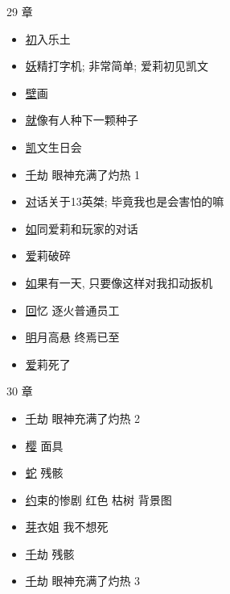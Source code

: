 \documentclass[a4paper]{article}
\begin{document}
29 章

\begin{itemize}
    \item \href{https://www.bilibili.com/video/BV15Y4y1872S/} 初入乐土
    \item \href{https://www.bilibili.com/video/BV15Y4y1872S/?t=4118} 妖精打字机; 非常简单; 爱莉初见凯文
    \item \href{https://www.bilibili.com/video/BV15Y4y1872S/?t=5141} 壁画
    \item \href{https://www.bilibili.com/video/BV15Y4y1872S/?p=4&t=1114} 就像有人种下一颗种子
    \item \href{https://www.bilibili.com/video/BV15Y4y1872S/?p=4&t=1675} 凯文生日会
    \item \href{https://www.bilibili.com/video/BV15Y4y1872S/?p=4&t=3315} 千劫 眼神充满了灼热 1
    \item \href{https://www.bilibili.com/video/BV15Y4y1872S/?p=4&t=3830} 对话关于13英桀; 毕竟我也是会害怕的嘛
    \item \href{https://www.bilibili.com/video/BV15Y4y1872S/?p=4&t=4235} 如同爱莉和玩家的对话
    \item \href{https://www.bilibili.com/video/BV15Y4y1872S/?p=4&t=5700} 爱莉破碎
    \item \href{https://www.bilibili.com/video/BV15Y4y1872S/?p=5} 如果有一天, 只要像这样对我扣动扳机
    \item \href{https://www.bilibili.com/video/BV15Y4y1872S/?p=5&t=321} 回忆 逐火普通员工
    \item \href{https://www.bilibili.com/video/BV15Y4y1872S/?p=5&t=812} 明月高悬 终焉已至
    \item \href{https://www.bilibili.com/video/BV15Y4y1872S/?p=5&t=1445} 爱莉死了
\end{itemize}

30 章

\begin{itemize}
    \item \href{https://www.bilibili.com/video/BV1gL4y1N7Yk/?t=5370} 千劫 眼神充满了灼热 2
    \item \href{https://www.bilibili.com/video/BV1gL4y1N7Yk/?t=6000} 樱 面具
    \item \href{https://www.bilibili.com/video/BV1gL4y1N7Yk/?p=3&t=1338} 蛇 残骸
    \item \href{https://www.bilibili.com/video/BV1gL4y1N7Yk/?p=3&t=2419} 约束的惨剧 红色 枯树 背景图
    \item \href{https://www.bilibili.com/video/BV1gL4y1N7Yk/?p=3&t=3830} 芽衣姐 我不想死
    \item \href{https://www.bilibili.com/video/BV1gL4y1N7Yk/?p=5&t=1850} 千劫 残骸
    \item \href{https://www.bilibili.com/video/BV1gL4y1N7Yk/?p=5&t=3389} 千劫 眼神充满了灼热 3
\end{itemize}
\end{document}
